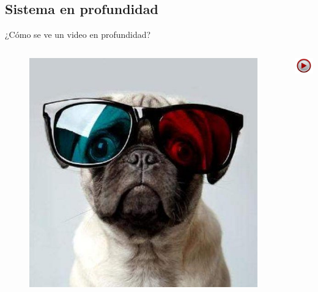 \documentclass[]{beamer}
\newcommand{\video}[1]{
    \begin{center}
        \href{run:#1}{
            \includegraphics[width=1cm]{img/play.jpeg}
        }
    \end{center}
}
\begin{document}
\subsection{Sistema en profundidad}
\begin{frame}{¿Cómo se ve un video en profundidad?}
    \begin{columns}
        \begin{column}{0.8\textwidth}
            \begin{figure}[t]
                \vspace{-15pt}
                \centering
                \includegraphics[scale=0.4]{img/anteojos/poner_anteojos_3d_5.jpg}
            \end{figure}
        \end{column}
        \begin{column}{0.15\textwidth}
            \video{videos/seguimiento_depth.avi}
        \end{column}
    \end{columns}
\end{frame}
\end{document}
